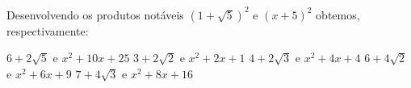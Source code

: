 Desenvolvendo os produtos notáveis $(1+\sqrt{5})^2$ e $(x+5)^2$ obtemos, respectivamente:

$6+2\sqrt{5}$ e $x^2+10x+25$
$3+2\sqrt{2}$ e $x^2+2x+1$
$4+2\sqrt{3}$ e $x^2+4x+4$
$6+4\sqrt{2}$ e $x^2+6x+9$
$7+4\sqrt{3}$ e $x^2+8x+16$


